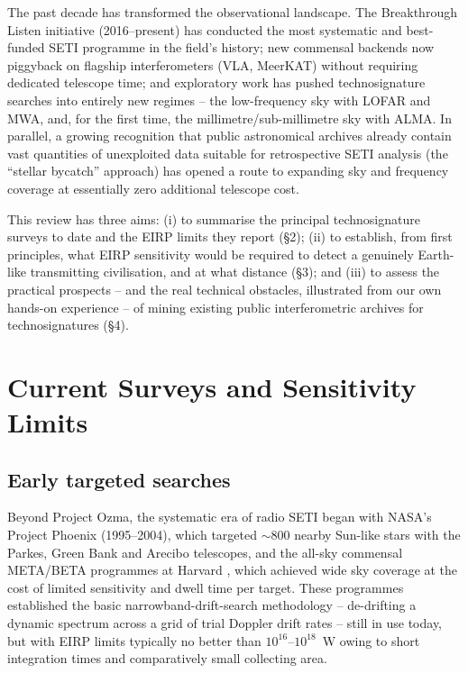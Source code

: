 \documentclass[10pt,twocolumn]{article}
\begin{document}
The past decade has transformed the observational landscape. The Breakthrough Listen initiative (2016--present) has conducted the most systematic and best-funded SETI programme in the field's history; new commensal backends now piggyback on flagship interferometers (VLA, MeerKAT) without requiring dedicated telescope time; and exploratory work has pushed technosignature searches into entirely new regimes -- the low-frequency sky with LOFAR and MWA, and, for the first time, the millimetre/sub-millimetre sky with ALMA. In parallel, a growing recognition that public astronomical archives already contain vast quantities of unexploited data suitable for retrospective SETI analysis (the ``stellar bycatch'' approach) has opened a route to expanding sky and frequency coverage at essentially zero additional telescope cost.

This review has three aims: (i) to summarise the principal technosignature surveys to date and the EIRP limits they report (\S2); (ii) to establish, from first principles, what EIRP sensitivity would be required to detect a genuinely Earth-like transmitting civilisation, and at what distance (\S3); and (iii) to assess the practical prospects -- and the real technical obstacles, illustrated from our own hands-on experience -- of mining existing public interferometric archives for technosignatures (\S4).

\section{Current Surveys and Sensitivity Limits}

\subsection{Early targeted searches}
Beyond Project Ozma, the systematic era of radio SETI began with NASA's Project Phoenix (1995--2004), which targeted $\sim800$ nearby Sun-like stars with the Parkes, Green Bank and Arecibo telescopes, and the all-sky commensal META/BETA programmes at Harvard \citep{horowitz1993}, which achieved wide sky coverage at the cost of limited sensitivity and dwell time per target. These programmes established the basic narrowband-drift-search methodology -- de-drifting a dynamic spectrum across a grid of trial Doppler drift rates -- still in use today, but with EIRP limits typically no better than $10^{16}$--$10^{18}$~W owing to short integration times and comparatively small collecting area.
\end{document}
